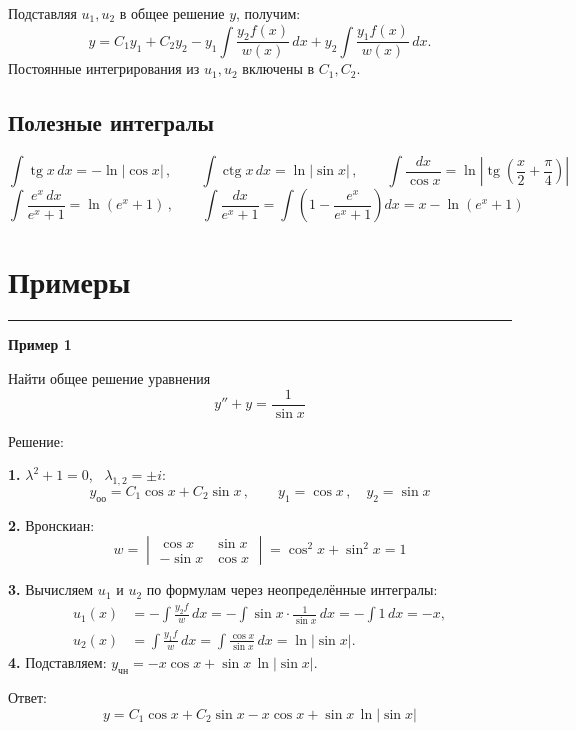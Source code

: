 \documentclass[11pt,a4paper]{article}
\newcommand{\example}[1]{\par\medskip\noindent\textbf{#1}\par\nopagebreak\smallskip}
\newcommand{\yoo}{y_{\text{оо}}}
\newcommand{\ych}{y_{\text{чн}}}
\newcommand{\tgn}{\operatorname{tg}}
\newcommand{\ctgn}{\operatorname{ctg}}
\begin{document}
Подставляя $u_1,u_2$ в общее решение $y$, получим:
\[
  \boxed{
    y = C_1y_1 + C_2y_2
      - y_1\int\frac{y_2f(x)}{w(x)}\,dx
      + y_2\int\frac{y_1f(x)}{w(x)}\,dx
  }.
\]
Постоянные интегрирования из $u_1,u_2$ включены в $C_1,C_2$.


\subsection*{Полезные интегралы}

\[
  \int \tgn x\, dx = -\ln|\cos x|\,, \qquad
  \int \ctgn x\, dx = \ln|\sin x|\,, \qquad
  \int \frac{dx}{\cos x} = \ln\left|\tgn\left(\frac{x}{2} + \frac{\pi}{4}\right)\right|
\]
\[
  \int \frac{e^{x}\, dx}{e^{x} + 1} = \ln(e^{x} + 1)\,, \qquad
  \int \frac{dx}{e^{x} + 1} = \int \left(1 - \frac{e^{x}}{e^{x} + 1}\right) dx = x - \ln(e^{x} + 1)
\]

\section*{Примеры}

\medskip\hrule\medskip

\example{Пример 1}

Найти общее решение уравнения
\[
  y'' + y = \frac{1}{\sin x}
\]

Решение:

\textbf{1.} $\lambda^2 + 1 = 0$, \ $\lambda_{1,2} = \pm i$:
\[
  \yoo = C_1\cos x + C_2\sin x\,, \qquad y_1 = \cos x\,, \quad y_2 = \sin x
\]

\textbf{2.} Вронскиан:
\[
  w = \begin{vmatrix} \cos x & \sin x \\ -\sin x & \cos x \end{vmatrix} = \cos^2 x + \sin^2 x = 1
\]

\textbf{3.} Вычисляем $u_1$ и $u_2$ по формулам через неопределённые интегралы:
\[
  \begin{aligned}
    u_1(x) &= -\int\frac{y_2f}{w}\,dx
      = -\int\sin x\cdot\frac{1}{\sin x}\,dx = -\int 1\,dx = -x,\\
    u_2(x) &= \int\frac{y_1f}{w}\,dx
      = \int\frac{\cos x}{\sin x}\,dx = \ln|\sin x|.
  \end{aligned}
\]
\textbf{4.} Подставляем: $\ych = -x\cos x + \sin x\,\ln|\sin x|$.

Ответ:
\[
  y = C_1\cos x + C_2\sin x - x\cos x + \sin x\,\ln|\sin x|
\]
\end{document}
